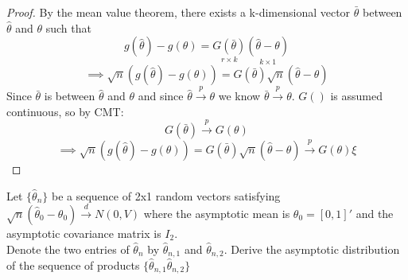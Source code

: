 \documentclass[DIV=14,titlepage=false]{scrreprt}
\begin{document}
\begin{proof}
    By the mean value theorem, there exists a k-dimensional vector $\bar \theta$ between $\hat \theta$ and $\theta$ such that\[
    g(\hat{\theta}) - g(\theta) = \underset{r \times k}{G(\bar{\theta})} \underset{k \times 1}{(\hat{\theta} - \theta)}\]
    \[ \implies \sqrt{n}(g(\hat{\theta}) - g(\theta)) = G(\bar{\theta}) \sqrt{n} (\hat{\theta} - \theta)\]
    Since $\bar \theta$ is between $\hat \theta$ and $\theta$ and since $\hat \theta \overset{p}{\to} \theta$ we know $\bar \theta \overset{p}{\to}\theta$. $G()$ is assumed continuous, so by CMT: \[G(\bar \theta) \overset{p}{\to} G(\theta)\]
    \[ \implies \sqrt{n}(g(\hat{\theta}) - g(\theta)) = G(\bar{\theta}) \sqrt{n} (\hat{\theta} - \theta) \overset{p}{\to} G(\theta) \xi\]
\end{proof}

\begin{exercise}
    Let $\{\hat\theta_n\}$ be a sequence of 2x1 random vectors satisfying $\sqrt{n}(\hat\theta_0-\theta_0)\overset{d}{\to}N(0,V)$ where the asymptotic mean is $\theta_0 = [0,1]'$ and the asymptotic covariance matrix is $I_2$.\\
     Denote the two entries of $\hat\theta_n$ by $\hat\theta_{n,1}$ and $\hat\theta_{n,2}$. Derive the asymptotic distribution of the sequence of products $\{\hat\theta_{n,1}\hat\theta_{n,2}\}$
\end{exercise}
\end{document}
